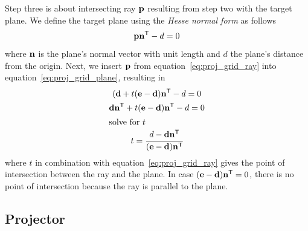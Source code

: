 Step three is about intersecting ray $\mathbf{p}$ resulting from step two with the target plane.
We define the target plane using the \textit{Hesse normal form} as follows
\begin{equation}
\label{eq:proj_grid_plane}
 \mathbf{p}\mathbf{n}^{\mathsf{T}} - d = 0
\end{equation}
where $\mathbf{n}$ is the plane's normal vector with unit length and $d$ the plane's distance
from the origin. Next, we insert $\mathbf{p}$ from equation~\ref{eq:proj_grid_ray}
into equation~\ref{eq:proj_grid_plane}, resulting in
%
\begin{gather}
\label{eq:plane_and_ray_intersection}
(\mathbf{d} + t(\mathbf{e} - \mathbf{d})\mathbf{n}^{\mathsf{T}} - d = 0\\
\mathbf{d}\mathbf{n}^{\mathsf{T}} + t(\mathbf{e} - \mathbf{d})\mathbf{n}^{\mathsf{T}} - d = 0\\
\intertext{solve for $t$}
t = \cfrac{d - \mathbf{d}\mathbf{n}^{\mathsf{T}}}{(\mathbf{e} - \mathbf{d})\mathbf{n}^{\mathsf{T}}}
\end{gather}
%
where $t$ in combination with equation~\ref{eq:proj_grid_ray} gives the point of intersection
between the ray and the plane. In case $(\mathbf{e} - \mathbf{d})\mathbf{n}^{\mathsf{T}} = 0$,
there is no point of intersection because the ray is parallel to the plane.

\subsection{Projector}

